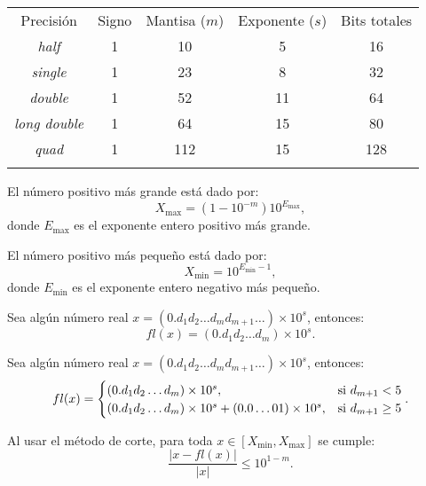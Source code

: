 \documentclass[8pt,a4paper]{extarticle}
\begin{document}
\begin{multicols}{3}
\begin{center}
	\begin{tabular}{| c || c | c | c || c |}
		\hhline{-||---||-}
		Precisión          & Signo & Mantisa ($m$) & Exponente ($s$) & Bits totales \\
		\hhline{=::===::=}
		\emph{half}        & 1 & 10  & 5  & 16  \\
		\emph{single}      & 1 & 23	 & 8  & 32	\\
		\emph{double}      & 1 & 52	 & 11 & 64  \\
		\emph{long double} & 1 & 64	 & 15 & 80  \\
		\emph{quad}        & 1 & 112 & 15 & 128 \\
		\hhline{-||---||-}
	\end{tabular}
\end{center}

\begin{boxprop}[]
	El número positivo más grande está dado por:
	\[
		X_{\max} = \left( 1 - 10^{-m} \right) 10^{E_{\max}}
	,\]
	donde $E_{\max}$ es el exponente entero positivo más grande.
\end{boxprop}

\begin{boxprop}[]
	El número positivo más pequeño está dado por:
	\[
		X_{\min} = 10^{E_{\min} - 1}
	,\] 
	donde $E_{\min}$ es el exponente entero negativo más pequeño.
\end{boxprop}

\begin{boxdef}
	Sea algún número real $x = (0.d_1 d_2 \ldots d_m d_{m + 1} \ldots) \times 10^s$, entonces:
	\[
		fl(x)= (0.d_1 d_2 \ldots d_m) \times 10^s
	.\]
\end{boxdef}

\begin{boxdef}
	Sea algún número real $ x = (0.d_1 d_2 \ldots d_m d_{m + 1} \ldots) \times 10^s$, entonces:
	\[
		fl(x) = \begin{cases}
			(0.d_1 d_2 \ldots d_m) \times 10^s, & \text{\normalfont si } d_{m+1} < 5 \\
			(0.d_1 d_2 \ldots d_m) \times 10^s + (0.0 \ldots 01)\times 10^s, & \text{\normalfont si } d_{m+1} \ge 5
		\end{cases}
	.\] 
\end{boxdef}

\begin{boxtheo}[]
	Al usar el método de corte, para toda $x \in \left[ X_{\min}, X_{\max} \right]$ se cumple:
	\[
		\frac{\left| x - fl(x) \right| }{ \left| x \right|  } \le 10^{1 - m}
	.\] 
\end{boxtheo}


\end{multicols}
\end{document}

